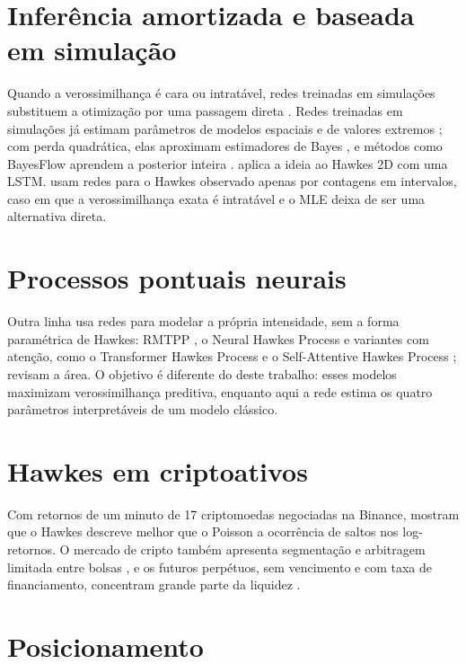 \documentclass[12pt,a4paper,openany]{report}
\begin{document}
\section{Inferência amortizada e baseada em simulação}

Quando a verossimilhança é cara ou intratável, redes treinadas em simulações
substituem a otimização por uma passagem direta \citep{cranmer2020}. Redes treinadas
em simulações já estimam parâmetros de modelos espaciais e de valores extremos
\citep{gerber2021,lenzi2023}; com perda quadrática, elas aproximam estimadores de Bayes
\citep{sainsburydale2024}, e métodos como BayesFlow aprendem a posterior inteira
\citep{radev2022}. \citet{lee2023} aplica a ideia ao Hawkes 2D com
uma LSTM. \citet{lambe2025} usam redes para o Hawkes observado apenas por contagens
em intervalos, caso em que a verossimilhança exata é intratável e o MLE deixa de ser
uma alternativa direta.

\section{Processos pontuais neurais}

Outra linha usa redes para modelar a própria intensidade, sem a forma paramétrica de
Hawkes: RMTPP \citep{du2016}, o Neural Hawkes Process \citep{mei2017} e variantes com
atenção, como o Transformer Hawkes Process \citep{zuo2020} e o Self-Attentive Hawkes
Process \citep{zhang2020}; \citet{shchur2021} revisam a área. O objetivo é diferente
do deste trabalho: esses modelos maximizam verossimilhança preditiva, enquanto aqui a
rede estima os quatro parâmetros interpretáveis de um modelo clássico.

\section{Hawkes em criptoativos}

Com retornos de um minuto de 17 criptomoedas negociadas na Binance,
\citet{taddeo2024} mostram que o Hawkes descreve melhor que o Poisson a ocorrência de
saltos nos log-retornos. O mercado de cripto também apresenta
segmentação e arbitragem limitada entre bolsas \citep{makarov2020}, e os futuros
perpétuos, sem vencimento e com taxa de financiamento, concentram grande parte da
liquidez \citep{he2022perpetual}.

\section{Posicionamento}
\end{document}
